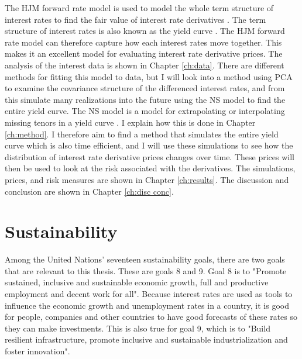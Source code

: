 \noindent The HJM forward rate model is used to model the whole term structure of interest rates to find the fair value of interest rate derivatives \cite{investopedia_hjm_model}. The term structure of interest rates is also known as the yield curve \cite{investopedia_term_structure}. The HJM forward rate model can therefore capture how each interest rates move together. This makes it an excellent model for evaluating interest rate derivative prices. The analysis of the interest data is shown in Chapter \ref{ch:data}. There are different methods for fitting this model to data, but I will look into a method using PCA to examine the covariance structure of the differenced interest rates, and from this simulate many realizations into the future using the NS model to find the entire yield curve. The NS model is a model for extrapolating or interpolating missing tenors in a yield curve \cite{science_direct_nelson_siegel}. I explain how this is done in Chapter \ref{ch:method}. I therefore aim to find a method that simulates the entire yield curve which is also time efficient, and I will use these simulations to see how the distribution of interest rate derivative prices changes over time. These prices will then be used to look at the risk associated with the derivatives. The simulations, prices, and risk measures are shown in Chapter \ref{ch:results}. The discussion and conclusion are shown in Chapter \ref{ch:disc conc}.

\section{Sustainability}

\noindent Among the United Nations' seventeen sustainability goals, there are two goals that are relevant to this thesis. These are goals 8 and 9. Goal 8 is to "Promote sustained, inclusive and sustainable economic growth, full and productive employment and decent work for all". Because interest rates are used as tools to influence the economic growth and unemployment rates in a country, it is good for people, companies and other countries to have good forecasts of these rates so they can make investments. This is also true for goal 9, which is to "Build resilient infrastructure, promote inclusive and sustainable industrialization and foster innovation". \cite{fn}
